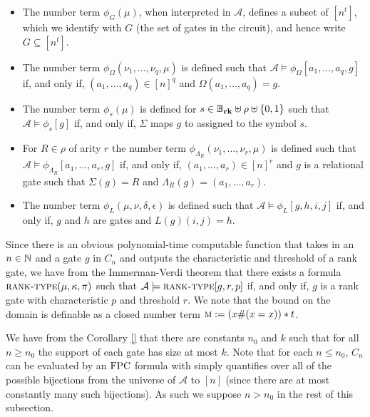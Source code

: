 \documentclass[../paper.tex]{subfiles}
\begin{document}
\begin{itemize}
	\setlength\itemsep{0mm}
	\item The number term $\phi_G(\mu)$, when interpreted in $\mathcal{A}$, defines
	      a subset of $[n^t]$, which we identify with $G$ (the set of gates in the
	      circuit), and hence write $G \subseteq [n^t]$.
	\item The number term $\phi_{\Omega}(\nu_1, \ldots , \nu_q, \mu)$ is defined
	      such that $\mathcal{A} \models \phi_\Omega[a_1, \ldots, a_q, g]$ if, and only
	      if, $(a_1, \ldots, a_q) \in [n]^q$ and $\Omega(a_1, \ldots, a_q) = g$.
	\item The number term $\phi_s (\mu)$ is defined for $s \in \mathbb{B}_{\text{\textbf{rk}}} \uplus \rho
	      \uplus \{0,1\}$ such that $\mathcal{A} \models \phi_s [g]$ if, and only if,
	      $\Sigma$ maps $g$ to assigned to the symbol $s$.
	      	      
	\item For $R \in \rho$ of arity $r$ the number term $\phi_{\Lambda_R}(\nu_1,
	      \ldots, \nu_r, \mu)$ is defined such that $\mathcal{A} \models
	      \phi_{\Lambda_R} [a_1, \ldots, a_r, g]$ if, and only if, $(a_1, \ldots,
	      a_r)\in [n]^r$ and $g$ is a relational gate such that $\Sigma (g) = R$ and
	      $\Lambda_R (g) = (a_1, \ldots, a_r)$.
	\item The number term $\phi_L(\mu, \nu, \delta, \epsilon)$ is defined such that $\mathcal{A} \models \phi_L[g,h,i,j]$ if, and only if, $g$ and $h$ are gates and $L(g)(i,j) = h$.
\end{itemize}

Since there is an obvious polynomial-time computable function that takes in an $n \in \mathbb{N}$ and a gate $g$ in $C_n$ and outputs the characteristic and threshold of a rank gate, we have from the Immerman-Verdi theorem that there exists a formula $\textsc{rank-type}(\mu, \kappa , \pi)$ such that $\mathcal{A} \models \textsc{rank-type}[g, r, p]$ if, and only if, $g$ is a rank
gate with characteristic $p$ and threshold $r$. We note that the bound on the
domain is definable as a closed number term $\textsc{m} := (x\# (x = x))*t$.

We have from the Corollary \ref{} that there are constants $n_0$ and $k$ such
that for all $n \geq n_0$ the support of each gate has size at most $k$. Note
that for each $n \leq n_0$, $C_n$ can be evaluated by an $\text{\upshape FPC}$ formula with
simply quantifies over all of the possible bijections from the universe of
$\mathcal{A}$ to $[n]$ (since there are at most constantly many such
bijections). As such we suppose $n > n_0$ in the rest of this subsection.
\end{document}
